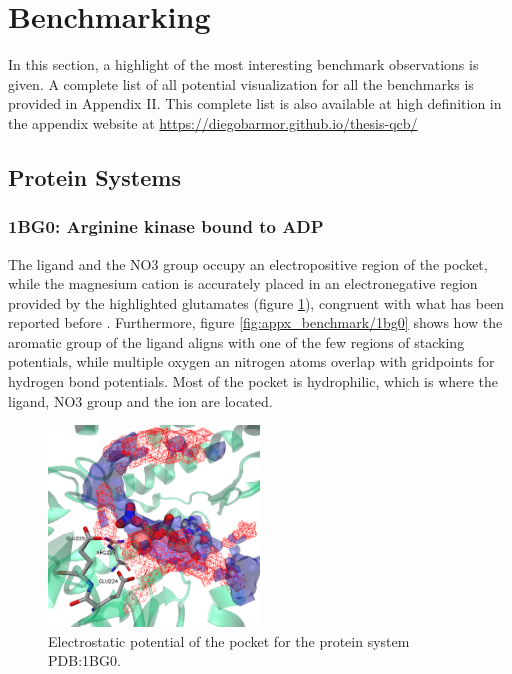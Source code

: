 \section{Benchmarking}
  In this section, a highlight of the most interesting benchmark observations is given. A complete list of all potential visualization for all the benchmarks is provided in Appendix II. This complete list is also available at high definition in the appendix website at \url{https://diegobarmor.github.io/thesis-qcb/}

  \subsection{Protein Systems}
    \subsubsection{1BG0: Arginine kinase bound to ADP}
      The ligand and the NO3 group occupy an electropositive region of the pocket, while the magnesium cation is accurately placed in an electronegative region provided by the highlighted glutamates (figure \ref{fig:benchmark/1bg0}), congruent with what has been reported before \cite{benchmark_negative_2000}. Furthermore, figure \ref{fig:appx_benchmark/1bg0} shows how the aromatic group of the ligand aligns with one of the few regions of stacking potentials, while multiple oxygen an nitrogen atoms overlap with gridpoints for hydrogen bond potentials. Most of the pocket is hydrophilic, which is where the ligand, NO3 group and the ion are located.

      \begin{figure}[H]
        \centering
        \includegraphics[width=0.5\textwidth]{figures/results/benchmark_prot/1bg0.png}
        \caption{\label{fig:benchmark/1bg0} Electrostatic potential of the pocket for the protein system PDB:1BG0.}
      \end{figure}

